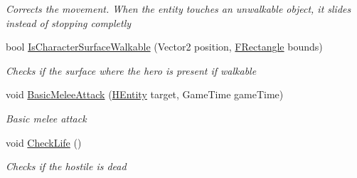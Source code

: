 \begin{DoxyCompactItemize}
\begin{DoxyCompactList}\small\item\em Corrects the movement. When the entity touches an unwalkable object, it slides instead of stopping completly \end{DoxyCompactList}\item 
bool \hyperlink{class_hel_project_1_1_game_world_1_1_entities_1_1_h_entity_aae0d26ad34844b800ff4608f51d81548}{Is\+Character\+Surface\+Walkable} (Vector2 position, \hyperlink{class_hel_project_1_1_tools_1_1_f_rectangle}{F\+Rectangle} bounds)
\begin{DoxyCompactList}\small\item\em Checks if the surface where the hero is present if walkable \end{DoxyCompactList}\item 
void \hyperlink{class_hel_project_1_1_game_world_1_1_entities_1_1_h_entity_aa52555f6c5958eae0596dac05ac51958}{Basic\+Melee\+Attack} (\hyperlink{class_hel_project_1_1_game_world_1_1_entities_1_1_h_entity}{H\+Entity} target, Game\+Time game\+Time)
\begin{DoxyCompactList}\small\item\em Basic melee attack \end{DoxyCompactList}\item 
void \hyperlink{class_hel_project_1_1_game_world_1_1_entities_1_1_h_entity_a6f85c104941a1c6920950e2672df32b4}{Check\+Life} ()
\begin{DoxyCompactList}\small\item\em Checks if the hostile is dead \end{DoxyCompactList}\end{DoxyCompactItemize}
